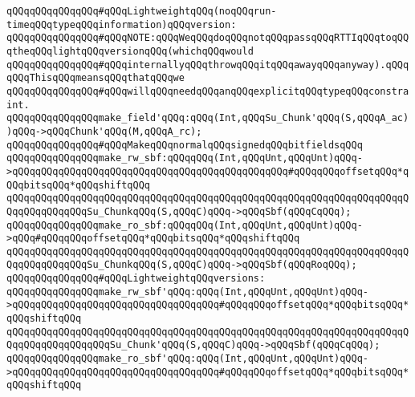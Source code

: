 \newline
\newline
\verb|qQQqqQQqqQQqqQQq#qQQqLightweightqQQq(noqQQqrun-timeqQQqtypeqQQqinformation)qQQqversion:|\newline
\newline
\verb|qQQqqQQqqQQqqQQq#qQQqNOTE:qQQqWeqQQqdoqQQqnotqQQqpassqQQqRTTIqQQqtoqQQqtheqQQqlightqQQqversionqQQq(whichqQQqwould|\newline
\verb|qQQqqQQqqQQqqQQq#qQQqinternallyqQQqthrowqQQqitqQQqawayqQQqanyway).qQQqqQQqThisqQQqmeansqQQqthatqQQqwe|\newline
\verb|qQQqqQQqqQQqqQQq#qQQqwillqQQqneedqQQqanqQQqexplicitqQQqtypeqQQqconstraint.|\newline
\verb|qQQqqQQqqQQqqQQqmake_field'qQQq:qQQq(Int,qQQqSu_Chunk'qQQq(S,qQQqA_ac))qQQq->qQQqChunk'qQQq(M,qQQqA_rc);|\newline
\newline
\verb|qQQqqQQqqQQqqQQq#qQQqMakeqQQqnormalqQQqsignedqQQqbitfieldsqQQq|\newline
\verb|qQQqqQQqqQQqqQQqmake_rw_sbf:qQQqqQQq(Int,qQQqUnt,qQQqUnt)qQQq->qQQqqQQqqQQqqQQqqQQqqQQqqQQqqQQqqQQqqQQqqQQqqQQq#qQQqqQQqoffsetqQQq*qQQqbitsqQQq*qQQqshiftqQQq|\newline
\verb|qQQqqQQqqQQqqQQqqQQqqQQqqQQqqQQqqQQqqQQqqQQqqQQqqQQqqQQqqQQqqQQqqQQqqQQqqQQqqQQqqQQqSu_ChunkqQQq(S,qQQqC)qQQq->qQQqSbf(qQQqCqQQq);|\newline
\newline
\verb|qQQqqQQqqQQqqQQqmake_ro_sbf:qQQqqQQq(Int,qQQqUnt,qQQqUnt)qQQq->qQQq#qQQqqQQqoffsetqQQq*qQQqbitsqQQq*qQQqshiftqQQq|\newline
\verb|qQQqqQQqqQQqqQQqqQQqqQQqqQQqqQQqqQQqqQQqqQQqqQQqqQQqqQQqqQQqqQQqqQQqqQQqqQQqqQQqqQQqSu_ChunkqQQq(S,qQQqC)qQQq->qQQqSbf(qQQqRoqQQq);|\newline
\newline
\verb|qQQqqQQqqQQqqQQq#qQQqLightweightqQQqversions:|\newline
\verb|qQQqqQQqqQQqqQQqmake_rw_sbf'qQQq:qQQq(Int,qQQqUnt,qQQqUnt)qQQq->qQQqqQQqqQQqqQQqqQQqqQQqqQQqqQQqqQQq#qQQqqQQqoffsetqQQq*qQQqbitsqQQq*qQQqshiftqQQq|\newline
\verb|qQQqqQQqqQQqqQQqqQQqqQQqqQQqqQQqqQQqqQQqqQQqqQQqqQQqqQQqqQQqqQQqqQQqqQQqqQQqqQQqqQQqqQQqSu_Chunk'qQQq(S,qQQqC)qQQq->qQQqSbf(qQQqCqQQq);|\newline
\verb|qQQqqQQqqQQqqQQqmake_ro_sbf'qQQq:qQQq(Int,qQQqUnt,qQQqUnt)qQQq->qQQqqQQqqQQqqQQqqQQqqQQqqQQqqQQqqQQq#qQQqqQQqoffsetqQQq*qQQqbitsqQQq*qQQqshiftqQQq|\newline
